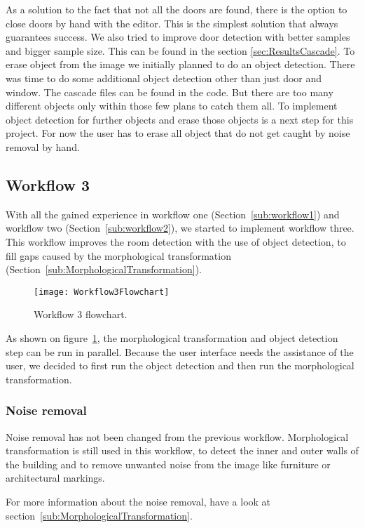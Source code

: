 As a solution to the fact that not all the doors are found, there is the option to close doors by hand with the editor. This is the simplest solution that always guarantees success. We also tried to improve door detection with better samples and bigger sample size. This can be found in the section \ref{sec:ResultsCascade}.
To erase object from the image we initially planned to do an object detection. There was time to do some additional object detection other than just door and window. The cascade files can be found in the code. But there are too many different objects only within those few plans to catch them all. To implement object detection for further objects and erase those objects is a next step for this project. For now the user has to erase all object that do not get caught by noise removal by hand.

\pagebreak
\subsection{Workflow 3}
\label{sub:workflow3}
With all the gained experience in workflow one (Section~\ref{sub:workflow1}) and workflow two (Section~\ref{sub:workflow2}), we started to implement workflow three. This workflow improves the room detection with the use of object detection, to fill gaps caused by the morphological transformation (Section~\ref{sub:MorphologicalTransformation}).

\begin{figure}[H]
	\centering
	\texttt{[image: Workflow3Flowchart]}
	\caption{Workflow 3 flowchart.}
	\label{fig:Workflow3Flowchart}
\end{figure}

As shown on figure~\ref{fig:Workflow3Flowchart}, the morphological transformation and object detection step can be run in parallel. Because the user interface needs the assistance of the user, we decided to first run the object detection and then run the morphological transformation.

\subsubsection{Noise removal}
\label{sub:NoiseRemoval}
Noise removal has not been changed from the previous workflow. Morphological transformation is still used in this workflow, to detect the inner and outer walls of the building and to remove unwanted noise from the image like furniture or architectural markings.

For more information about the noise removal, have a look at section~\ref{sub:MorphologicalTransformation}.

